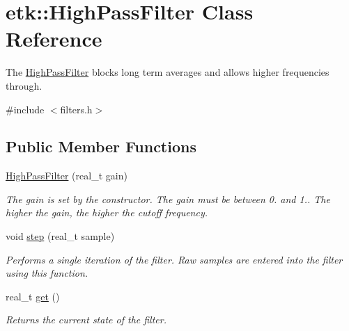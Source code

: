 \hypertarget{classetk_1_1_high_pass_filter}{\section{etk\-:\-:High\-Pass\-Filter Class Reference}
\label{classetk_1_1_high_pass_filter}
}


The \hyperlink{classetk_1_1_high_pass_filter}{High\-Pass\-Filter} blocks long term averages and allows higher frequencies through.  




{\ttfamily \#include $<$filters.\-h$>$}

\subsection*{Public Member Functions}
\begin{DoxyCompactItemize}
\item 
\hypertarget{classetk_1_1_high_pass_filter_ab909bdafbb6c61c4aea3cc8992542285}{\hyperlink{classetk_1_1_high_pass_filter_ab909bdafbb6c61c4aea3cc8992542285}{High\-Pass\-Filter} (real\-\_\-t gain)}\label{classetk_1_1_high_pass_filter_ab909bdafbb6c61c4aea3cc8992542285}

\begin{DoxyCompactList}\small\item\em The gain is set by the constructor. The gain must be between 0. and 1.. The higher the gain, the higher the cutoff frequency. \end{DoxyCompactList}\item 
void \hyperlink{classetk_1_1_high_pass_filter_a679d243641f3ab15eba34cd5e3a64d18}{step} (real\-\_\-t sample)
\begin{DoxyCompactList}\small\item\em Performs a single iteration of the filter. Raw samples are entered into the filter using this function. \end{DoxyCompactList}\item 
\hypertarget{classetk_1_1_high_pass_filter_a19431d355cd6bd350d4603e31a0cedcf}{real\-\_\-t \hyperlink{classetk_1_1_high_pass_filter_a19431d355cd6bd350d4603e31a0cedcf}{get} ()}\label{classetk_1_1_high_pass_filter_a19431d355cd6bd350d4603e31a0cedcf}

\begin{DoxyCompactList}\small\item\em Returns the current state of the filter. \end{DoxyCompactList}\end{DoxyCompactItemize}


